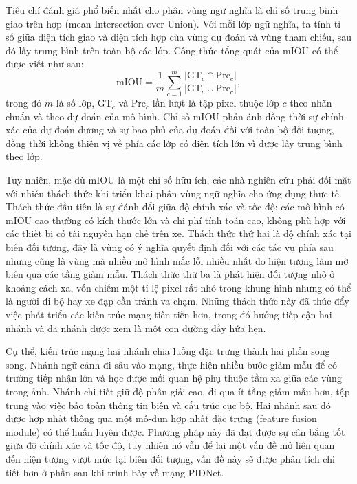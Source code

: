 Tiêu chí đánh giá phổ biến nhất cho phân vùng ngữ nghĩa là chỉ số trung bình giao trên hợp (mean Intersection over Union). Với mỗi lớp ngữ nghĩa, ta tính tỉ số giữa diện tích giao và diện tích hợp của vùng dự đoán và vùng tham chiếu, sau đó lấy trung bình trên toàn bộ các lớp. Công thức tổng quát của mIOU có thể được viết như sau:
\begin{equation}
  \text{mIOU} = \frac{1}{m} \sum_{c=1}^{m} \frac{|\text{GT}_c \cap \text{Pre}_c|}{|\text{GT}_c \cup \text{Pre}_c|},
\end{equation}
trong đó $m$ là số lớp, $\text{GT}_c$ và $\text{Pre}_c$ lần lượt là tập pixel thuộc lớp $c$ theo nhãn chuẩn và theo dự đoán của mô hình. Chỉ số mIOU phản ánh đồng thời sự chính xác của dự đoán dương và sự bao phủ của dự đoán đối với toàn bộ đối tượng, đồng thời không thiên vị về phía các lớp có diện tích lớn vì được lấy trung bình theo lớp.

Tuy nhiên, mặc dù mIOU là một chỉ số hữu ích, các nhà nghiên cứu phải đối mặt với nhiều thách thức khi triển khai phân vùng ngữ nghĩa cho ứng dụng thực tế. Thách thức đầu tiên là sự đánh đổi giữa độ chính xác và tốc độ; các mô hình có mIOU cao thường có kích thước lớn và chi phí tính toán cao, không phù hợp với các thiết bị có tài nguyên hạn chế trên xe. Thách thức thứ hai là độ chính xác tại biên đối tượng, đây là vùng có ý nghĩa quyết định đối với các tác vụ phía sau nhưng cũng là vùng mà nhiều mô hình mắc lỗi nhiều nhất do hiện tượng làm mờ biên qua các tầng giảm mẫu. Thách thức thứ ba là phát hiện đối tượng nhỏ ở khoảng cách xa, vốn chiếm một tỉ lệ pixel rất nhỏ trong khung hình nhưng có thể là người đi bộ hay xe đạp cần tránh va chạm. Những thách thức này đã thúc đẩy việc phát triển các kiến trúc mạng tiên tiến hơn, trong đó hướng tiếp cận hai nhánh và đa nhánh được xem là một con đường đầy hứa hẹn.

Cụ thể, kiến trúc mạng hai nhánh chia luồng đặc trưng thành hai phần song song. Nhánh ngữ cảnh đi sâu vào mạng, thực hiện nhiều bước giảm mẫu để có trường tiếp nhận lớn và học được mối quan hệ phụ thuộc tầm xa giữa các vùng trong ảnh. Nhánh chi tiết giữ độ phân giải cao, đi qua ít tầng giảm mẫu hơn, tập trung vào việc bảo toàn thông tin biên và cấu trúc cục bộ. Hai nhánh sau đó được hợp nhất thông qua một mô-đun hợp nhất đặc trưng (feature fusion module) có thể huấn luyện được. Phương pháp này đã đạt được sự cân bằng tốt giữa độ chính xác và tốc độ, tuy nhiên nó vẫn để lại một vấn đề mở liên quan đến hiện tượng vượt mức tại biên đối tượng, vấn đề này sẽ được phân tích chi tiết hơn ở phần sau khi trình bày về mạng PIDNet.

